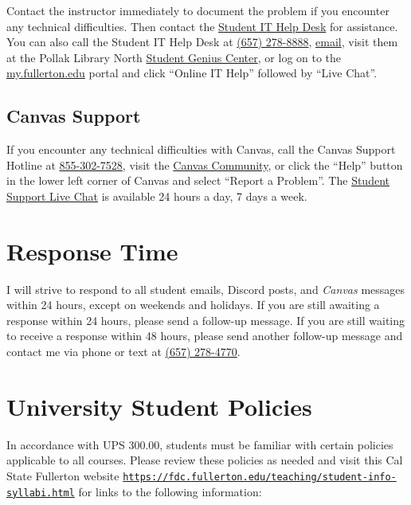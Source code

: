 \documentclass[12pt, letterpaper]{article}
\begin{document}
Contact the instructor immediately to document the problem if you encounter any technical difficulties. Then contact the \href{http://www.fullerton.edu/it/students/helpdesk/index.php}{Student IT Help Desk} for assistance. You can also call the Student IT Help Desk at \href{tel:+16572788888}{(657) 278-8888}, \href{mailto:StudentITHelpDesk@fullerton.edu}{email}, visit them at the Pollak Library North \href{http://www.fullerton.edu/it/students/sgc/index.php}{Student Genius Center}, or log on to the \href{http://my.fullerton.edu/}{my.fullerton.edu} portal and click ``Online IT Help'' followed by ``Live Chat''.

\subsection*{Canvas Support}

If you encounter any technical difficulties with Canvas, call the Canvas Support Hotline at \href{tel:+18553027528}{855-302-7528}, visit the \href{https://community.canvaslms.com/docs/DOC-10720-67952720329}{Canvas Community}, or click the ``Help'' button in the lower left corner of Canvas and select ``Report a Problem''. The \href{https://cases.canvaslms.com/liveagentchat?chattype=student&sfid=001A000000YzcwQIAR}{Student Support Live Chat} is available 24 hours a day, 7 days a week.

\section{Response Time} I will strive to respond to all student emails, Discord posts, and \emph{Canvas} messages within 24 hours, except on weekends and holidays. If you are still awaiting a response within 24 hours, please send a follow-up message. If you are still waiting to receive a response within 48 hours, please send another follow-up message and contact me via phone or text at \href{tel:+16572784770}{(657) 278-4770}.


\section{University Student Policies}

In accordance with UPS 300.00, students must be familiar with certain policies applicable to all courses. Please review these policies as needed and visit this Cal State Fullerton website \texttt{\href{https://fdc.fullerton.edu/teaching/student-info-syllabi.html}{https://fdc.fullerton.edu/teaching/student-info-syllabi.html}} for links to the following information:
\end{document}
